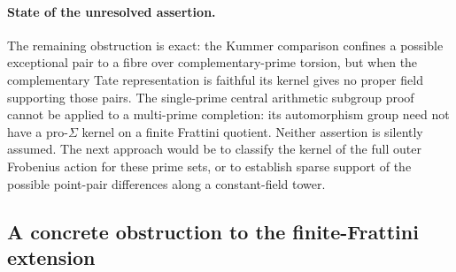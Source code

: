 \documentclass[11pt,a4paper]{article}
\begin{document}
\paragraph{State of the unresolved assertion.}

The remaining obstruction is exact: the Kummer comparison confines a
possible exceptional pair to a fibre over complementary-prime torsion,
but when the complementary Tate representation is faithful its kernel
gives no proper field supporting those pairs. The single-prime central
arithmetic subgroup proof cannot be applied to a multi-prime completion:
its automorphism group need not have a pro-\(\Sigma\) kernel on a finite
Frattini quotient. Neither assertion is silently assumed. The next
approach would be to classify the kernel of the full outer Frobenius
action for these prime sets, or to establish sparse support of the
possible point-pair differences along a constant-field tower.



\subsection{A concrete obstruction to the finite-Frattini extension}
\end{document}
